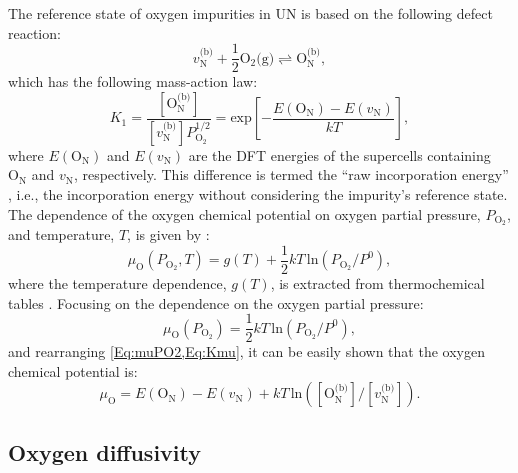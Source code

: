 \documentclass[preprint,12pt,sort&compress]{elsarticle}
\newcommand{\?}{\stackrel{?}{=}}
\begin{document}
The reference state of oxygen impurities in UN is based on the following defect reaction:
\begin{equation}
v_\text{N}^\text{(b)} + \frac{1}{2} \text{O}_2 \text{(g)} \rightleftharpoons \text{O}_\text{N}^\text{(b)},
\end{equation}
which has the following mass-action law:
\begin{equation}
K_1 = \frac{ [ \text{O}_\text{N}^\text{(b)} ] }{ [ v_\text{N}^\text{(b)} ] P_{\text{O}_2}^{1/2} } = \text{exp}\! \left[ - \frac{E( \text{O}_\text{N} ) - E( v_\text{N} )}{kT} \right],
\label{Eq:Kmu}
\end{equation}
where $E( \text{O}_\text{N} )$ and $E( v_\text{N} )$ are the DFT energies of the supercells containing $\text{O}_\text{N}$ and $v_\text{N}$, respectively. This difference is termed the ``raw incorporation energy'' \cite{AbdulHameed2024}, i.e., the incorporation energy without considering the impurity's reference state. The dependence of the oxygen chemical potential on oxygen partial pressure, $P_{\text{O}_2}$, and temperature, $T$, is given by \cite{Finnis2005}:
\begin{equation}
\mu_\text{O}(P_{\text{O}_2}, T) = g(T) + \frac{1}{2} kT \, \text{ln} \!\left( P_{\text{O}_2} / P^0 \right),
\label{Eq:muTPO2}
\end{equation}
where the temperature dependence, $g(T)$, is extracted from thermochemical tables \cite{Linstrom2024}. Focusing on the dependence on the oxygen partial pressure:
\begin{equation}
\mu_\text{O}(P_{\text{O}_2}) = \frac{1}{2} kT \, \text{ln} \!\left( P_{\text{O}_2} / P^0 \right),
\label{Eq:muPO2}
\end{equation}
and rearranging \cref{Eq:muPO2,Eq:Kmu}, it can be easily shown that the oxygen chemical potential is:
\begin{equation}
\mu_\text{O} = E( \text{O}_\text{N} ) - E( v_\text{N} ) + kT \, \text{ln} \! \left( [ \text{O}_\text{N}^\text{(b)} ] / [ v_\text{N}^\text{(b)} ] \right).
\label{Eq:OxygenTruePot}
\end{equation}

\subsection{Oxygen diffusivity}
\end{document}
